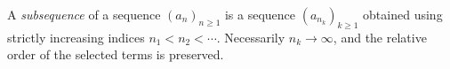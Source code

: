
A \emph{subsequence} of a sequence $(a_n)_{n\ge1}$ is a sequence $(a_{n_k})_{k\ge1}$ obtained using strictly increasing indices $n_1<n_2<\cdots$. Necessarily $n_k\to\infty$, and the relative order of the selected terms is preserved.
